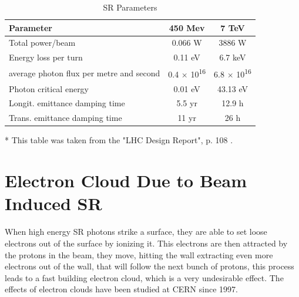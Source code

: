 \begin{table}%
\caption{SR Parameters} %
\begin{minipage}{\textwidth}
\begin{tabular}{l c c}%
\hline
\hline %
Parameter & 450 Mev & 7 TeV \\[0.5ex]%
\hline %
Total power/beam & 0.066 W & 3886 W \\ %
Energy loss per turn & 0.11 eV & 6.7 keV \\
average photon flux per metre and second & 0.4 $\times$ 10\textsuperscript{16} & 6.8 $\times$ 10\textsuperscript{16} \\
Photon critical energy & 0.01 eV & 43.13 eV \\
Longit. emittance damping time & 5.5 yr & 12.9 h \\
Trans. emittance damping time & 11 yr & 26 h \\ [1ex] %
\hline %
\end{tabular}
\end{minipage}
\begin{minipage}{\textwidth}
\begin{footnotesize}
* This table was taken from the "LHC Design Report", p. 108 \citep{DR}.
\end{footnotesize}
\end{minipage}
\label{table:LHCSR} %
\end{table}



\section{Electron Cloud Due to Beam Induced SR}

When high energy SR photons strike a surface, they are able to set loose electrons out of the surface by ionizing it. This electrons are then attracted by the protons in the beam, they move, hitting the wall extracting even more electrons out of the wall, that will follow the next bunch of protons, this process leads to a fast building electron cloud, which is a very undesirable effect. The effects of electron clouds have been studied at CERN since 1997\cite{rumolo2011electron}.




